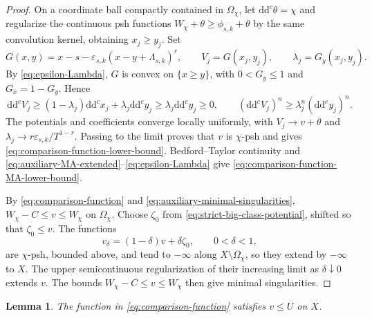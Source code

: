 \documentclass[oneside,english,letterpaper]{amsart}
\numberwithin{equation}{section}
\theoremstyle{plain}
\newtheorem{lem}[thm]{Lemma}
\theoremstyle{definition}
\theoremstyle{remark}
\renewcommand{\d}{\mathrm{d}}
\newcommand{\ddc}{\d\d^c}
\begin{document}
\begin{proof}

On a coordinate ball compactly contained in $\Omega_\chi$, let
$\ddc\theta=\chi$ and regularize the continuous psh functions
$W_\chi+\theta\geq\phi_{s,k}+\theta$ by the same convolution
kernel, obtaining $x_j\geq y_j$. Set
\[
G(x,y)=x-s-\varepsilon_{s,k}(x-y+\Lambda_{s,k})^r,
\qquad V_j=G(x_j,y_j),\qquad \lambda_j=G_y(x_j,y_j).
\]
By \eqref{eq:epsilon-Lambda}, $G$ is convex on $\{x\geq y\}$,
with $0<G_y\leq1$ and $G_x=1-G_y$. Hence
\[
\ddc V_j\geq(1-\lambda_j)\ddc x_j+\lambda_j\ddc y_j
\geq\lambda_j\ddc y_j\geq0,
\qquad
(\ddc V_j)^n\geq\lambda_j^n(\ddc y_j)^n.
\]
The potentials and coefficients converge locally uniformly,
with $V_j\to v+\theta$ and
$\lambda_j\to r\varepsilon_{s,k}/T^{1-r}$.
Passing to the limit proves that $v$ is $\chi$-psh and gives
\eqref{eq:comparison-function-lower-bound}.
Bedford--Taylor continuity and
\eqref{eq:auxiliary-MA-extended}--\eqref{eq:epsilon-Lambda}
give \eqref{eq:comparison-function-MA-lower-bound}.

By \eqref{eq:comparison-function} and
\eqref{eq:auxiliary-minimal-singularities},
$W_\chi-C\leq v\leq W_\chi$ on $\Omega_\chi$.
Choose $\zeta_0$ from \eqref{eq:strict-big-class-potential},
shifted so that $\zeta_0\leq v$. The functions
\[
v_\delta=(1-\delta)v+\delta\zeta_0,\qquad 0<\delta<1,
\]
are $\chi$-psh, bounded above, and tend to $-\infty$ along
$X\setminus\Omega_\chi$, so they extend by $-\infty$ to $X$.
The upper semicontinuous regularization of their increasing
limit as $\delta\downarrow0$ extends $v$.
The bounds $W_\chi-C\leq v\leq W_\chi$ then give minimal singularities.

\end{proof}



	

\begin{lem}
	\label{lem:comparison-function-below-U}
	The function in \eqref{eq:comparison-function} satisfies $v\leq U$
	on $X$.
\end{lem}
\end{document}
